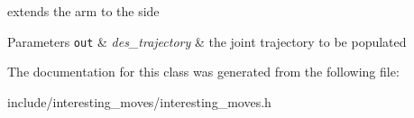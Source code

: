 extends the arm to the side 
\begin{DoxyParams}[1]{Parameters}
\mbox{\tt out}  & {\em des\-\_\-trajectory} & the joint trajectory to be populated \\
\hline
\end{DoxyParams}


The documentation for this class was generated from the following file\-:\begin{DoxyCompactItemize}
\item 
include/interesting\-\_\-moves/interesting\-\_\-moves.\-h\end{DoxyCompactItemize}
